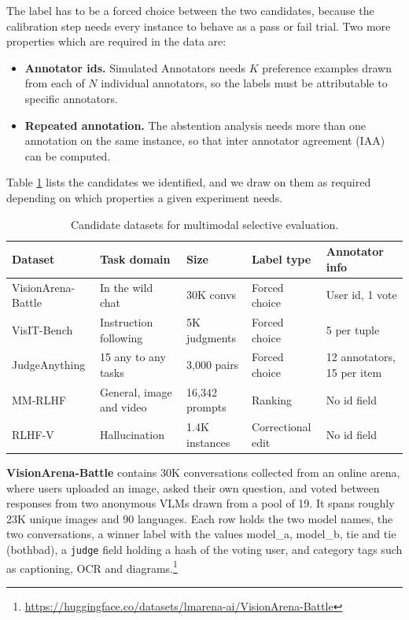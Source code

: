 \documentclass[11pt,a4paper]{article}
\begin{document}
The label has to be a forced choice between the two candidates, because the calibration
step needs every instance to behave as a pass or fail trial. Two more properties which are required in the data are:

\begin{itemize}
\item \textbf{Annotator ids.} Simulated Annotators needs $K$ preference examples
drawn from each of $N$ individual annotators, so the labels must be attributable to
specific annotators.
\item \textbf{Repeated annotation.} The abstention analysis needs more than one annotation
on the same instance, so that inter annotator agreement (IAA) can be computed.
\end{itemize}

Table \ref{tab:datasets} lists the
candidates we identified, and we draw on them as required depending on which properties a
given experiment needs.

\begin{table}[h]
\centering
\small
\begin{tabular}{lllll}
\toprule
\textbf{Dataset} & \textbf{Task domain} & \textbf{Size} & \textbf{Label type} & \textbf{Annotator info} \\
\midrule
VisionArena-Battle & In the wild chat & 30K convs & Forced choice & User id, 1 vote \\
VisIT-Bench & Instruction following & 5K judgments & Forced choice & 5 per tuple \\
JudgeAnything & 15 any to any tasks & 3,000 pairs & Forced choice & 12 annotators, 15 per item \\
MM-RLHF & General, image and video & 16,342 prompts & Ranking & No id field \\
RLHF-V & Hallucination & 1.4K instances & Correctional edit & No id field \\
\bottomrule
\end{tabular}
\caption{Candidate datasets for multimodal selective evaluation.}
\label{tab:datasets}
\end{table}

\textbf{VisionArena-Battle} \citep{chou2024visionarena} contains 30K conversations
collected from an online arena, where users uploaded an image, asked their own question,
and voted between responses from two anonymous VLMs drawn from a pool of 19. It spans
roughly 23K unique images and 90 languages. Each row holds the two model names, the two
conversations, a winner label with the values model\_a, model\_b, tie and tie (bothbad), a
\texttt{judge} field holding a hash of the voting user, and category tags such as
captioning, OCR and diagrams.\footnote{\url{https://huggingface.co/datasets/lmarena-ai/VisionArena-Battle}}
\end{document}
